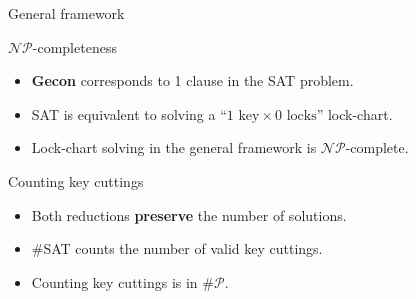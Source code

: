 \begin{frame}{General framework}
  \begin{block}{$\mathcal{NP}$-completeness}
    \begin{itemize}
      \item \textbf{Gecon} corresponds to 1 clause in the SAT problem.
      \item SAT is equivalent to solving a
            “$1 \text{ key} \times 0 \text{ locks}$” lock-chart.
      \item Lock-chart solving in the general framework is $\mathcal{NP}$-complete.
    \end{itemize}
  \end{block}
  \pause
  \begin{block}{Counting key cuttings}
    \begin{itemize}
      \item Both reductions \textbf{preserve} the number of solutions.
      \item \#SAT counts the number of valid key cuttings.
      \item Counting key cuttings is in $\#\mathcal{P}$.
    \end{itemize}
  \end{block}
\end{frame}


